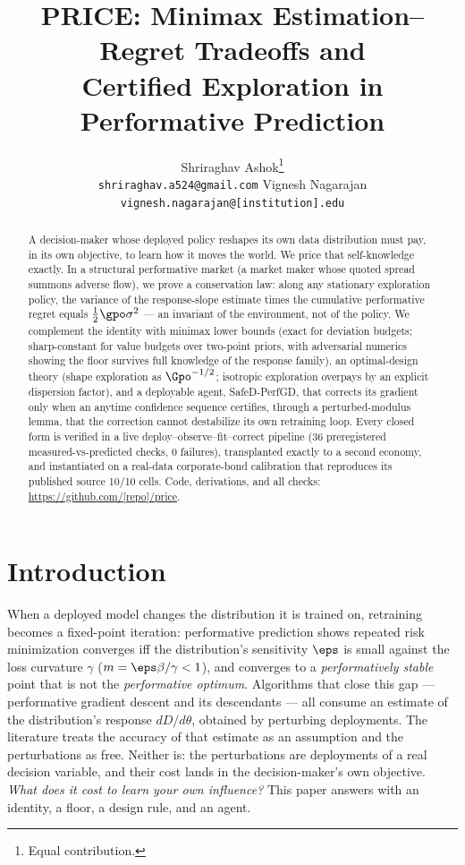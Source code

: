 \documentclass{article}
\title{PRICE: Minimax Estimation--Regret Tradeoffs and\\ Certified Exploration in Performative Prediction}
\author{%
  Shriraghav Ashok\thanks{Equal contribution.} \\
  \texttt{shriraghav.a524@gmail.com}
  \And
  Vignesh Nagarajan\footnotemark[1] \\
  \texttt{vignesh.nagarajan@[institution].edu}
}
\begin{document}
\maketitle

\begin{abstract}
A decision-maker whose deployed policy reshapes its own data distribution must pay, in its own objective, to learn how it moves the world. We price that self-knowledge exactly. In a structural performative market (a market maker whose quoted spread summons adverse flow), we prove a conservation law: along any stationary exploration policy, the variance of the response-slope estimate times the cumulative performative regret equals $\tfrac{1}{2}\gpo\sigma^2$ --- an invariant of the environment, not of the policy. We complement the identity with minimax lower bounds (exact for deviation budgets; sharp-constant for value budgets over two-point priors, with adversarial numerics showing the floor survives full knowledge of the response family), an optimal-design theory (shape exploration as $\Gpo^{-1/2}$; isotropic exploration overpays by an explicit dispersion factor), and a deployable agent, SafeD-PerfGD, that corrects its gradient only when an anytime confidence sequence certifies, through a perturbed-modulus lemma, that the correction cannot destabilize its own retraining loop. Every closed form is verified in a live deploy--observe--fit--correct pipeline (36 preregistered measured-vs-predicted checks, 0 failures), transplanted exactly to a second economy, and instantiated on a real-data corporate-bond calibration that reproduces its published source 10/10 cells. Code, derivations, and all checks: \url{https://github.com/[repo]/price}.
\end{abstract}

\section{Introduction}
\label{sec:intro}

When a deployed model changes the distribution it is trained on, retraining becomes a fixed-point iteration: performative prediction \citep{perdomo2020performative} shows repeated risk minimization converges iff the distribution's sensitivity $\eps$ is small against the loss curvature $\gamma$ ($m = \eps\beta/\gamma < 1$), and converges to a \emph{performatively stable} point that is not the \emph{performative optimum}. Algorithms that close this gap --- performative gradient descent and its descendants \citep{izzo2021learn,miller2021outside} --- all consume an estimate of the distribution's response $dD/d\theta$, obtained by perturbing deployments. The literature treats the accuracy of that estimate as an assumption and the perturbations as free. Neither is: the perturbations are deployments of a real decision variable, and their cost lands in the decision-maker's own objective. \emph{What does it cost to learn your own influence?} This paper answers with an identity, a floor, a design rule, and an agent.
\end{document}
